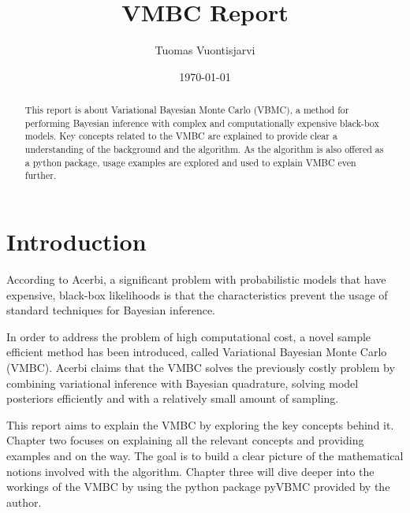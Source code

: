\documentclass[english,oneside,openany]{UH_DS_report}
\title{VMBC Report}
\author{Tuomas Vuontisjarvi}
\date{\today}
\begin{document}
\maketitle


\begin{abstract}
This report is about Variational Bayesian Monte Carlo (VBMC), a method for performing 
Bayesian inference with complex and computationally expensive black-box models. Key concepts
related to the VMBC are explained to provide clear a understanding of the background and the algorithm.
As the algorithm is also offered as a python package, usage examples are explored and used to explain 
VMBC even further.
\end{abstract}

\mytableofcontents

\mynomenclature


\chapter{Introduction}
\label{chapter:intro}

According to Acerbi\cite{acerbi2018}, a significant problem with probabilistic models that have expensive,
black-box likelihoods is that the characteristics prevent the usage of standard techniques for 
Bayesian inference.

In order to address the problem of high computational cost, a novel sample efficient method 
has been introduced, called Variational Bayesian Monte Carlo (VMBC). 
Acerbi claims that the VMBC solves the previously costly problem by combining 
variational inference with Bayesian quadrature, solving model posteriors efficiently 
and with a relatively small amount of sampling\cite{acerbi2018}.

This report aims to explain the VMBC by exploring the key concepts behind it. 
Chapter two focuses on explaining all the relevant concepts and providing examples 
and on the way. The goal is to build a clear picture of the mathematical notions involved with the algorithm. 
Chapter three will dive deeper into the workings of the VMBC
by using the python package pyVBMC provided by the author. 
\end{document}
